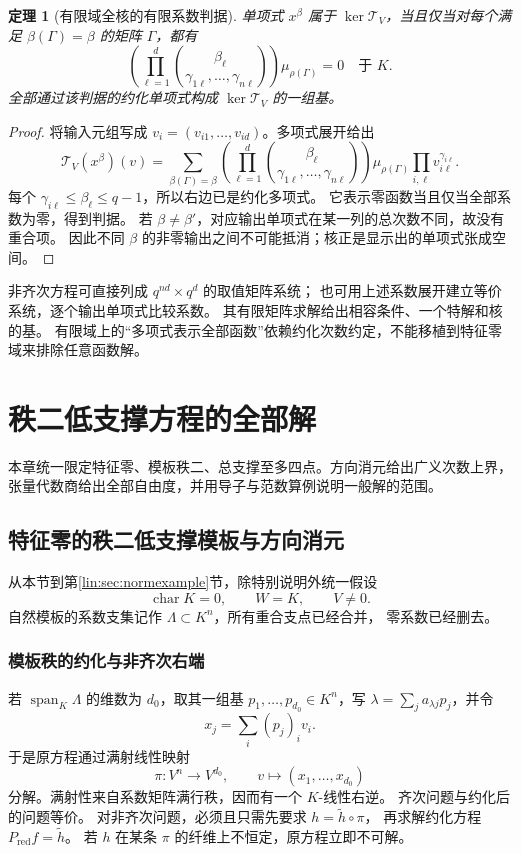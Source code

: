 \documentclass[11pt,a4paper,oneside,openany]{book}
\theoremstyle{lecture}
\newtheorem{theorem}{定理}[section]
\newcommand{\Span}{\operatorname{span}}
\newcommand{\T}{\mathcal T}
\numberwithin{equation}{section}
\begin{document}
\begin{theorem}[有限域全核的有限系数判据]\label{lin:thm:finitefull}
单项式 $x^\beta$ 属于 $\ker\T_V$，当且仅当对每个满足
$\beta(\Gamma)=\beta$ 的矩阵 $\Gamma$，都有
\begin{equation}\label{lin:eq:finitecoef}
 \left(\prod_{\ell=1}^d
 \binom{\beta_\ell}{\gamma_{1\ell},\ldots,\gamma_{n\ell}}\right)
 \mu_{\rho(\Gamma)}=0\quad\text{于 }K.
\end{equation}
全部通过该判据的约化单项式构成 $\ker\T_V$ 的一组基。
\end{theorem}
\begin{proof}
将输入元组写成 $v_i=(v_{i1},\ldots,v_{id})$。多项式展开给出
\[
 \T_V(x^\beta)(v)
 =
 \sum_{\beta(\Gamma)=\beta}
 \left(\prod_{\ell=1}^d
 \binom{\beta_\ell}{\gamma_{1\ell},\ldots,\gamma_{n\ell}}\right)
 \mu_{\rho(\Gamma)}
 \prod_{i,\ell}v_{i\ell}^{\gamma_{i\ell}}.
\]
每个 $\gamma_{i\ell}\le\beta_\ell\le q-1$，所以右边已是约化多项式。
它表示零函数当且仅当全部系数为零，得到判据。
若 $\beta\ne\beta'$，对应输出单项式在某一列的总次数不同，故没有重合项。
因此不同 $\beta$ 的非零输出之间不可能抵消；核正是显示出的单项式张成空间。
\end{proof}

非齐次方程可直接列成 $q^{nd}\times q^d$ 的取值矩阵系统；
也可用上述系数展开建立等价系统，逐个输出单项式比较系数。
其有限矩阵求解给出相容条件、一个特解和核的基。
有限域上的“多项式表示全部函数”依赖约化次数约定，不能移植到特征零域来排除任意函数解。


\chapter{秩二低支撑方程的全部解}\label{ch:lowrank}
本章统一限定特征零、模板秩二、总支撑至多四点。方向消元给出广义次数上界，张量代数商给出全部自由度，并用导子与范数算例说明一般解的范围。
\section{特征零的秩二低支撑模板与方向消元}\label{lin:sec:lowrank}
从本节到第\ref{lin:sec:normexample}节，除特别说明外统一假设
\[
 \operatorname{char}K=0,\qquad W=K,\qquad V\ne0.
\]
自然模板的系数支集记作 $\Lambda\subset K^n$，所有重合支点已经合并，
零系数已经删去。

\subsection{模板秩的约化与非齐次右端}
若 $\Span_K\Lambda$ 的维数为 $d_0$，取其一组基
$p_1,\ldots,p_{d_0}\in K^n$，写
$\lambda=\sum_j a_{\lambda j}p_j$，并令
\[
 x_j=\sum_i(p_j)_i v_i.
\]
于是原方程通过满射线性映射
\[
 \pi:V^n\longrightarrow V^{d_0},\qquad v\longmapsto(x_1,\ldots,x_{d_0})
\]
分解。满射性来自系数矩阵满行秩，因而有一个 $K$-线性右逆。
齐次问题与约化后的问题等价。
对非齐次问题，必须且只需先要求 $h=\widetilde h\circ\pi$，
再求解约化方程 $P_{\mathrm{red}}f=\widetilde h$。
若 $h$ 在某条 $\pi$ 的纤维上不恒定，原方程立即不可解。
\end{document}
